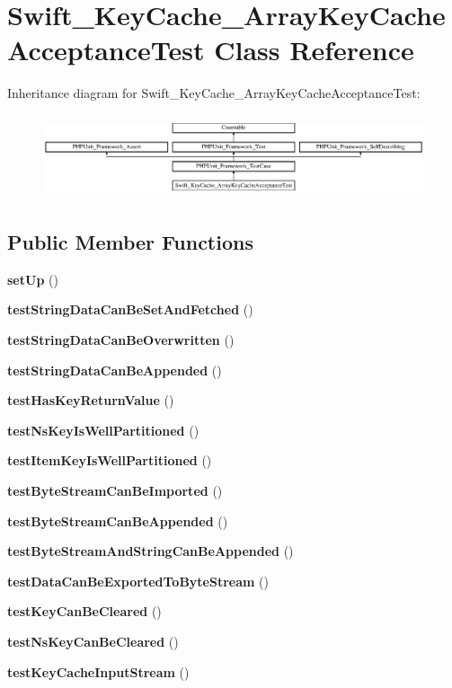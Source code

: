 \section{Swift\+\_\+\+Key\+Cache\+\_\+\+Array\+Key\+Cache\+Acceptance\+Test Class Reference}
\label{class_swift___key_cache___array_key_cache_acceptance_test}
Inheritance diagram for Swift\+\_\+\+Key\+Cache\+\_\+\+Array\+Key\+Cache\+Acceptance\+Test\+:\begin{figure}[H]
\begin{center}
\leavevmode
\includegraphics[height=2.464246cm]{class_swift___key_cache___array_key_cache_acceptance_test}
\end{center}
\end{figure}
\subsection*{Public Member Functions}
\begin{DoxyCompactItemize}
\item 
{\bf set\+Up} ()
\item 
{\bf test\+String\+Data\+Can\+Be\+Set\+And\+Fetched} ()
\item 
{\bf test\+String\+Data\+Can\+Be\+Overwritten} ()
\item 
{\bf test\+String\+Data\+Can\+Be\+Appended} ()
\item 
{\bf test\+Has\+Key\+Return\+Value} ()
\item 
{\bf test\+Ns\+Key\+Is\+Well\+Partitioned} ()
\item 
{\bf test\+Item\+Key\+Is\+Well\+Partitioned} ()
\item 
{\bf test\+Byte\+Stream\+Can\+Be\+Imported} ()
\item 
{\bf test\+Byte\+Stream\+Can\+Be\+Appended} ()
\item 
{\bf test\+Byte\+Stream\+And\+String\+Can\+Be\+Appended} ()
\item 
{\bf test\+Data\+Can\+Be\+Exported\+To\+Byte\+Stream} ()
\item 
{\bf test\+Key\+Can\+Be\+Cleared} ()
\item 
{\bf test\+Ns\+Key\+Can\+Be\+Cleared} ()
\item 
{\bf test\+Key\+Cache\+Input\+Stream} ()
\end{DoxyCompactItemize}
